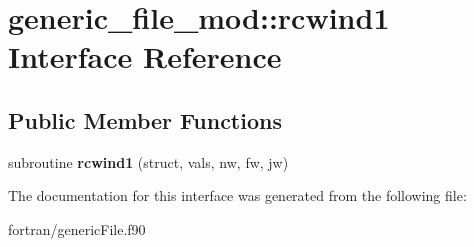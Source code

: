 \hypertarget{interfacegeneric__file__mod_1_1rcwind1}{}\section{generic\+\_\+file\+\_\+mod\+:\+:rcwind1 Interface Reference}
\label{interfacegeneric__file__mod_1_1rcwind1}
\subsection*{Public Member Functions}
\begin{DoxyCompactItemize}
\item 
\mbox{\label{interfacegeneric__file__mod_1_1rcwind1_a26196fdacd79a42d522af1a34dce33cc}} 
subroutine {\bfseries rcwind1} (struct, vals, nw, fw, jw)
\end{DoxyCompactItemize}


The documentation for this interface was generated from the following file\+:\begin{DoxyCompactItemize}
\item 
fortran/generic\+File.\+f90\end{DoxyCompactItemize}
